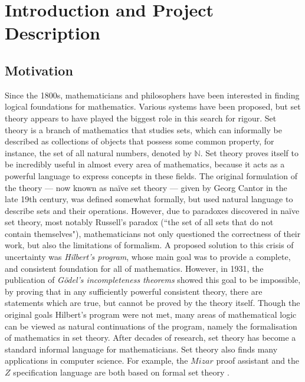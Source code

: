 \documentclass[11pt]{report}
\theoremstyle{definition}
\theoremstyle{theorem}
\theoremstyle{lemma}
\begin{document}
\tableofcontents

\chapter{Introduction and Project Description}
\section{Motivation}
Since the 1800s, mathematicians and philosophers have been interested in finding logical foundations for mathematics. Various systems have been proposed, but set theory appears to have played the biggest role in this search for rigour.
Set theory is a branch of mathematics that studies sets, which can informally be described as collections of objects that possess some common property, for instance, the set of all natural numbers, denoted by $\mathbb{N}$.
Set theory proves itself to be incredibly useful in almost every area of mathematics, because it acts as a powerful language to express concepts in these fields.
The original formulation of the theory --- now known as na\"ive set theory --- given by Georg Cantor in the late 19th century, was defined somewhat formally, but used natural language to describe sets and their operations.
However, due to paradoxes discovered in na\"ive set theory, most notably Russell's paradox (``the set of all sets that do not contain themselves"), mathematicians not only questioned the correctness of their work, but also the limitations of formalism.
A proposed solution to this crisis of uncertainty was \emph{Hilbert's program}, whose main goal was to provide a complete, and consistent foundation for all of mathematics.
However, in 1931, the publication of \emph{G\"odel's incompleteness theorems} showed this goal to be impossible, by proving that in any sufficiently powerful consistent theory, there are statements which are true, but cannot be proved by the theory itself.
Though the original goals Hilbert's program were not met, many areas of mathematical logic can be viewed as natural continuations of the program, namely the formalisation of mathematics in set theory.
After decades of research, set theory has become a standard informal language for mathematicians.
Set theory also finds many applications in computer science. 
For example, the $\mathit{Mizar}$ proof assistant and the $\mathit{Z}$ specification language are both based on formal set theory \cite{mizar} \cite{zspec}.\\
\end{document}
